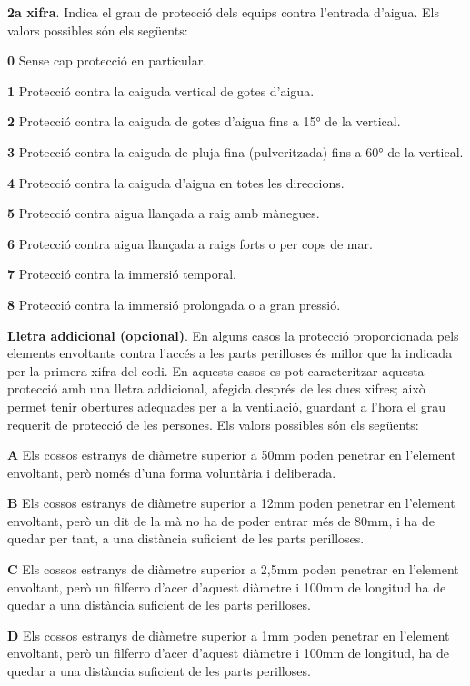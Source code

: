 \textbf{2a xifra}. Indica el grau de protecció dels equips contra
l'entrada d'aigua. Els valors possibles són els següents:
\begin{list}{}
   {\setlength{\labelwidth}{10mm} \setlength{\leftmargin}{10mm} \setlength{\labelsep}{2mm}}
   \item[\textbf{0}] Sense cap protecció en particular.
   \item[\textbf{1}] Protecció contra la caiguda vertical de gotes d'aigua.
   \item[\textbf{2}] Protecció contra la caiguda de gotes d'aigua fins a \ang{15} de la  vertical.
   \item[\textbf{3}] Protecció contra la caiguda de pluja fina (pulveritzada) fins a \ang{60} de la  vertical.
   \item[\textbf{4}] Protecció contra la caiguda d'aigua en totes les direccions.
   \item[\textbf{5}] Protecció contra aigua llançada a raig amb mànegues.
   \item[\textbf{6}] Protecció contra aigua llançada a raigs forts o per cops de mar.
   \item[\textbf{7}] Protecció contra la immersió temporal.
   \item[\textbf{8}] Protecció contra la immersió prolongada o a gran pressió.
\end{list}


\textbf{Lletra addicional (opcional)}. En alguns casos la protecció
proporcionada pels elements envoltants contra l'accés a les parts
perilloses és millor que la indicada per la primera xifra del codi.
En aquests casos es pot caracteritzar aquesta protecció amb una
lletra addicional, afegida després de les dues xifres; això permet
tenir obertures adequades per a la ventilació,  guardant a l'hora el
grau requerit de protecció de les persones. Els valors possibles són
els següents:
\begin{list}{}
   {\setlength{\labelwidth}{10mm} \setlength{\leftmargin}{10mm} \setlength{\labelsep}{2mm}}
   \item[\textbf{A}] Els  cossos estranys de diàmetre superior a
   50\unit{mm}    poden penetrar en l'element envoltant, però només d'una forma voluntària i deliberada.
   \item[\textbf{B}] Els  cossos estranys de diàmetre superior a 12\unit{mm}
    poden penetrar en l'element envoltant, però un dit de la mà no ha de poder entrar més de 80\unit{mm}, i
    ha de quedar per tant, a una distància    suficient de les parts perilloses.
   \item[\textbf{C}] Els  cossos estranys de diàmetre superior a 2,5\unit{mm}
   poden penetrar en l'element envoltant, però un filferro d'acer d'aquest diàmetre i 100\unit{mm}
   de longitud ha de quedar a una distància suficient de les parts perilloses.
   \item[\textbf{D}] Els  cossos estranys de diàmetre superior a 1\unit{mm}
   poden penetrar en l'element envoltant, però un filferro d'acer d'aquest diàmetre i 100\unit{mm}
   de longitud, ha de quedar a una distància suficient de les parts perilloses.
\end{list}


